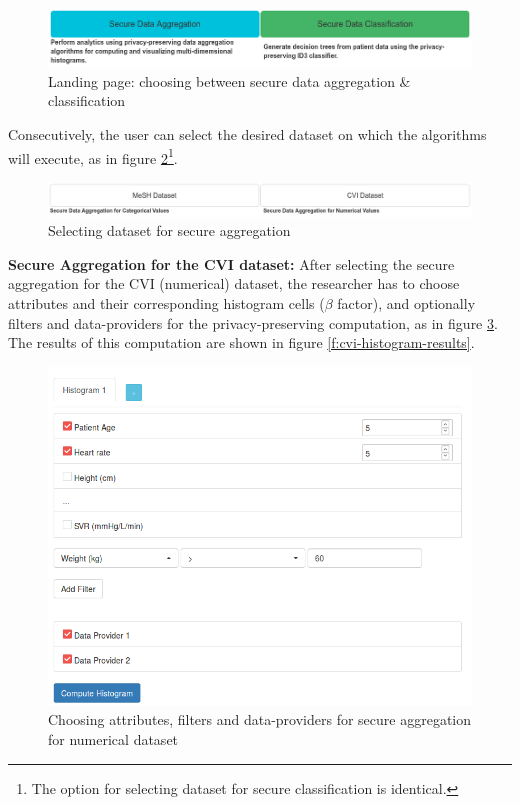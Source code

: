 \begin{figure}[H]
  \centering
  \includegraphics[width=\columnwidth]{figures/landing_buttons.png}
  \caption{Landing page: choosing between secure data aggregation \& classification}
  \label{f:landing-buttons}
\end{figure}

Consecutively, the user can select the desired dataset on which the algorithms will execute, as in figure \ref{f:mesh-cvi}\footnote{The option for selecting dataset for secure classification is identical.}.

\begin{figure}[H]
  \centering
  \includegraphics[width=\columnwidth]{figures/mesh_cvi.png}
  \caption{Selecting dataset for secure aggregation}
  \label{f:mesh-cvi}
\end{figure}



\textbf{Secure Aggregation for the CVI dataset:} After selecting the secure aggregation for the CVI (numerical) dataset, the researcher has to choose attributes and their corresponding histogram cells ($\beta$ factor), and optionally filters and data\hyp providers for the privacy\hyp preserving computation, as in figure \ref{f:cvi-histogram}.
The results of this computation are shown in figure \ref{f:cvi-histogram-results}.

\begin{figure}[H]
  \centering
  \includegraphics[width=0.7\columnwidth]{figures/cvi_histogram.png}
  \caption{Choosing attributes, filters and data\hyp providers for secure aggregation for numerical dataset}
  \label{f:cvi-histogram}
\end{figure}

